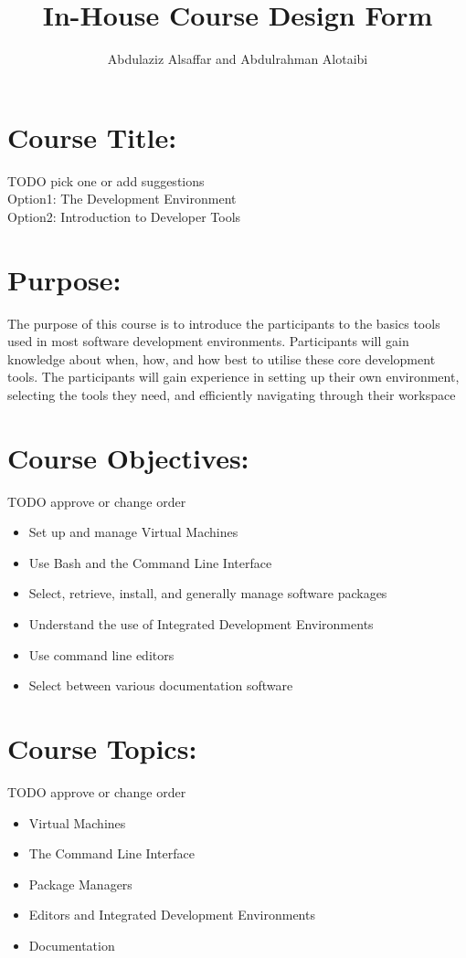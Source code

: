 \documentclass[a4paper,11pt]{article}
\author{Abdulaziz Alsa{f}far and Abdulrahman Alotaibi}
\title{In-House Course Design Form}
\begin{document}
\maketitle
\pagestyle{plain}
\setcounter{page}{1}

\section{Course Title:}
TODO pick one or add suggestions\\
Option1: The Development Environment\\
Option2: Introduction to Developer Tools

\section{Purpose:}
The purpose of this course is to introduce the participants to the basics tools used in most software development environments.
Participants will gain knowledge about when, how, and how best to utilise these core development tools. 
The participants will gain experience in setting up their own environment, selecting the tools they need, and e{f}ficiently navigating through their workspace

\section{Course Objectives:}
TODO approve or change order
\begin{itemize}
		\item Set up and manage Virtual Machines
		\item Use Bash and the Command Line Interface
		\item Select, retrieve, install, and generally manage software packages
		\item Understand the use of Integrated Development Environments
		\item Use command line editors
		\item Select between various documentation software
\end{itemize}

\section{Course Topics:}
TODO approve or change order
\begin{itemize}
		\item Virtual Machines
		\item The Command Line Interface
		\item Package Managers
		\item Editors and Integrated Development Environments
		\item Documentation
\end{itemize}
\end{document}
